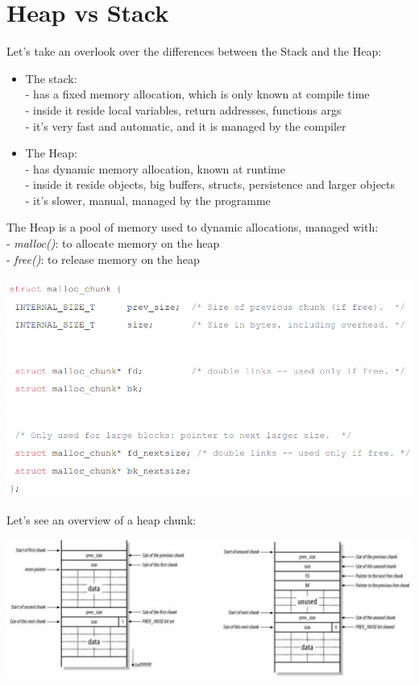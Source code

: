 \documentclass[11pt, oneside]{article}   	%
\begin{document}
\section*{Heap vs Stack}
Let's take an overlook over the differences between the Stack and the Heap:
\begin{itemize}
\item The stack:\\
- has a fixed memory allocation, which is only known at compile time\\
- inside it reside local variables, return addresses, functions args\\
- it's very fast and automatic, and it is managed by the compiler
\item The Heap:\\
- has dynamic memory allocation, known at runtime\\
- inside it reside objects, big buffers, structs, persistence and larger objects\\
- it's slower, manual, managed by the programme
\end{itemize}
The Heap is a pool of memory used to dynamic allocations, managed with:\\
- \emph{malloc()}: to allocate memory on the heap\\
- \emph{free()}: to release memory on the heap\\\begin{center}
\includegraphics[scale = 0.6]{heap}
\end{center}
Let's see an overview of a heap chunk:
\begin{center}
\includegraphics[scale = 0.6]{heap2}
\end{center}
\end{document}
